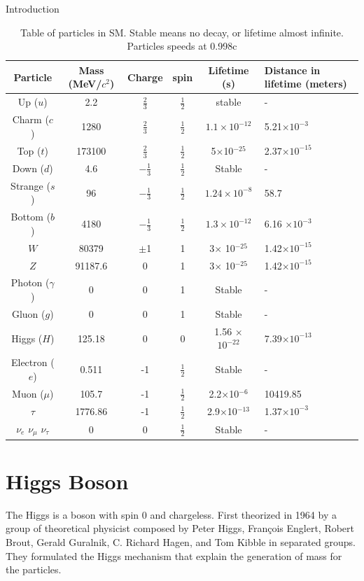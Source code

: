 \begin{chapter}{Introduction}
\begin{table}[!htbp]
\caption[Table of particles in SM]{Table of particles in SM\cite{pd}. Stable means no decay, or lifetime almost infinite. Particles speeds at 0.998c}
\renewcommand{\arraystretch}{1.5}
\begin{tabular}{|c|c|c|c|c|p{2.5cm}|}
\hline 
Particle	& Mass (MeV/$c^2$)  &Charge  & spin &Lifetime (s)  & Distance in lifetime (meters) \\ 
	\hline 
Up ($u$)	& 2.2 & $\frac{2}{3}$ & $\frac{1}{2}$ & stable &  -\\ 
	\hline 
Charm ($c$)	& 1280 &$\frac{2}{3}$  &  $\frac{1}{2}$ & $ 1.1 \times 10^{-12}$ &  5.21$\times 10^{-3}$ \\ 
	\hline 
Top	($t$)& 173100 & $\frac{2}{3}$ & $\frac{1}{2}$  & 5$\times$10$^{-25}$ &2.37$\times 10^{-15}$   \\ 
	\hline 
Down ($d$)	& 4.6 &$-\frac{1}{3}$  & $\frac{1}{2}$  & Stable & - \\ 
	\hline 
Strange ($s$)	& 96 &$-\frac{1}{3}$  & $\frac{1}{2}$  &$1.24 \times 10^{-8}$  & 58.7 \\ 
	\hline 
Bottom ($b$)	& 4180 &$-\frac{1}{3}$  &  $\frac{1}{2}$ &$1.3 \times 10^{-12}$   & 6.16 $\times 10^{-3}$\\ 
	\hline 
$W$ 	& 80379 &$\pm$1  & 1 & 3$\times$ 10$^{-25}$ &  1.42$\times 10^{-15}$\\ 
	\hline 
$Z$ & 91187.6 &0  & 1 & 3$\times$ 10$^{-25}$  &1.42$\times 10^{-15}$ \\ 
\hline
Photon ($\gamma$) & 0 &0  &  1&Stable  & - \\ 
\hline
Gluon ($g$)	& 0 &0  &  1&Stable  & - \\ 
	\hline 
Higgs ($H$)	& 125.18 &0  &  0& 1.56 $\times$ $10^{-22}$ & 7.39$\times 10^{-13}$ \\ 
	\hline 
Electron ($e$)& 0.511 & -1 &   $\frac{1}{2}$& Stable & - \\ 
	\hline 
Muon ($\mu$)	& 105.7 & -1  &  $\frac{1}{2}$ & 2.2$\times$10$^{-6}$ & 10419.85 \\ 
	\hline 
$\tau$	& 1776.86 &-1  &  $\frac{1}{2}$ & 2.9$\times$10$^{-13}$ & 1.37$\times 10^{-3}$\\ 
	\hline 
$\nu_e$	$\nu_\mu$ $\nu_\tau$& 0 & 0 &  $\frac{1}{2}$ & Stable &  -\\
	\hline 
\end{tabular} 
\label{SM table}
\end{table}
\newpage


\section{Higgs Boson}
The Higgs is a boson with spin 0 and chargeless. First theorized in 1964 by a group of theoretical physicist composed by Peter Higgs, Fran\c cois Englert, Robert Brout, Gerald Guralnik, C. Richard Hagen, and Tom Kibble in separated groups. They formulated the Higgs mechanism that explain the generation of mass for the particles. \\


\end{chapter}
